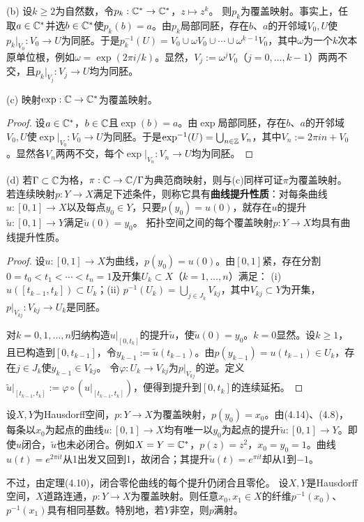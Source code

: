 (b) 设$k\ge2$为自然数，令$p_k:\mathbb C^*\to\mathbb C^*$，$z\mapsto z^k$。
则$p_k$为覆盖映射。事实上，任取$a\in\mathbb C^*$并选$b\in\mathbb C^*$使$p_k(b)=a$。由$p_k$局部同胚，存在$b$、$a$的开邻域$V_0,U$使$p_k|_{V_0}:V_0\to U$为同胚。于是$p_k^{-1}(U)=V_0\cup\omega V_0\cup\cdots\cup\omega^{k-1}V_0$，其中$\omega$为一个$k$次本原单位根，例如$\omega=\exp(2\pi i/k)$。显然，$V_j:=\omega^jV_0$（$j=0,\ldots,k-1$）两两不交，且$p_k|_{V_j}:V_j\to U$均为同胚。

(c) 映射$\exp:\mathbb C\to\mathbb C^*$为覆盖映射。
\begin{proof}
设$a\in\mathbb C^*$，$b\in\mathbb C$且$\exp(b)=a$。由$\exp$局部同胚，存在$b$、$a$的开邻域$V_0,U$使$\exp|_{V_0}:V_0\to U$为同胚。于是$\exp^{-1}(U)=\bigcup_{n\in\mathbb Z}V_n$，其中$V_n:=2\pi in+V_0$。显然各$V_n$两两不交，每个$\exp|_{V_n}:V_n\to U$均为同胚。
\end{proof}
(d) 若$\Gamma\subset\mathbb C$为格，$\pi:\mathbb C\to\mathbb C/\Gamma$为典范商映射，则与(c)同样可证$\pi$为覆盖映射。
若连续映射$p:Y\to X$满足下述条件，则称它具有\textbf{曲线提升性质}：对每条曲线$u:[0,1]\to X$以及每点$y_0\in Y$，只要$p(y_0)=u(0)$，就存在$u$的提升$\widetilde u:[0,1]\to Y$满足$\widetilde u(0)=y_0$。
拓扑空间之间的每个覆盖映射$p:Y\to X$均具有曲线提升性质。
\begin{proof}
设$u:[0,1]\to X$为曲线，$p(y_0)=u(0)$。由$[0,1]$紧，存在分割$0=t_0<t_1<\cdots<t_n=1$及开集$U_k\subset X$（$k=1,\ldots,n$）满足：
(i) $u([t_{k-1},t_k])\subset U_k$；(ii) $p^{-1}(U_k)=\bigcup_{j\in J_k}V_{kj}$，其中$V_{kj}\subset Y$为开集，$p|_{V_{kj}}:V_{kj}\to U_k$是同胚。

对$k=0,1,\ldots,n$归纳构造$u|_{[0,t_k]}$的提升$\widetilde u$，使$\widetilde u(0)=y_0$。$k=0$显然。设$k\ge1$，且已构造到$[0,t_{k-1}]$，令$y_{k-1}:=\widetilde u(t_{k-1})$。由$p(y_{k-1})=u(t_{k-1})\in U_k$，存在$j\in J_k$使$y_{k-1}\in V_{kj}$。
令$\varphi:U_k\to V_{kj}$为$p|_{V_{kj}}$的逆。定义$\widetilde u|_{[t_{k-1},t_k]}:=\varphi\circ(u|_{[t_{k-1},t_k]})$，便得到提升到$[0,t_k]$的连续延拓。
\end{proof}
设$X,Y$为Hausdorff空间，$p:Y\to X$为覆盖映射，$p(y_0)=x_0$。由(4.14)、(4.8)，每条以$x_0$为起点的曲线$u:[0,1]\to X$均有唯一以$y_0$为起点的提升$\widetilde u:[0,1]\to Y$。即使$u$闭合，$\widetilde u$也未必闭合。例如$X=Y=\mathbb C^*$，$p(z)=z^2$，$x_0=y_0=1$。曲线$u(t)=e^{2\pi it}$从1出发又回到1，故闭合；其提升$\widetilde u(t)=e^{\pi it}$却从1到$-1$。

不过，由定理(4.10)，闭合零伦曲线的每个提升仍闭合且零伦。
设$X,Y$是Hausdorff空间，$X$道路连通，$p:Y\to X$为覆盖映射。则任意$x_0,x_1\in X$的纤维$p^{-1}(x_0)$、$p^{-1}(x_1)$具有相同基数。特别地，若$Y$非空，则$p$满射。

